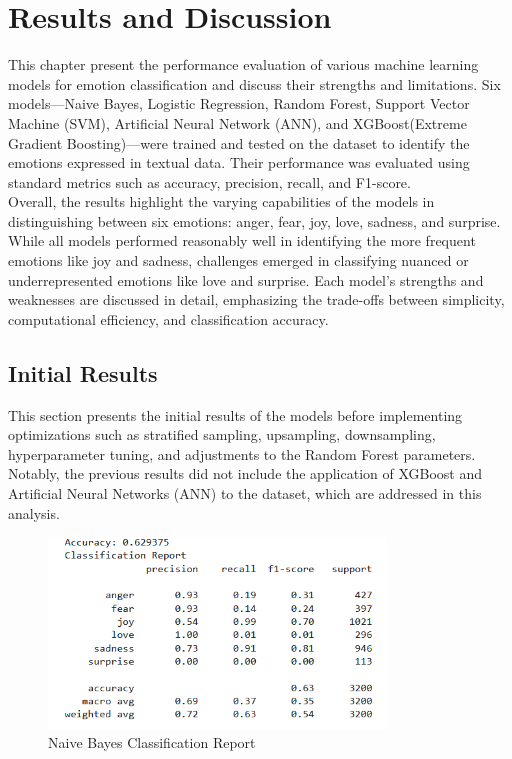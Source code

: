 \section{Results and Discussion}
This chapter present the performance evaluation of various machine learning models for emotion classification and discuss their strengths and limitations. Six models—Naive Bayes, Logistic Regression, Random Forest, Support Vector Machine (SVM), Artificial Neural Network (ANN), and XGBoost(Extreme Gradient Boosting)—were trained and tested on the dataset to identify the emotions expressed in textual data. Their performance was evaluated using standard metrics such as accuracy, precision, recall, and F1-score.\\

Overall, the results highlight the varying capabilities of the models in distinguishing between six emotions: anger, fear, joy, love, sadness, and surprise. While all models performed reasonably well in identifying the more frequent emotions like joy and sadness, challenges emerged in classifying nuanced or underrepresented emotions like love and surprise. Each model's strengths and weaknesses are discussed in detail, emphasizing the trade-offs between simplicity, computational efficiency, and classification accuracy.\\

\subsection{Initial Results}
This section presents the initial results of the models before implementing optimizations such as stratified sampling, upsampling, downsampling, hyperparameter tuning, and adjustments to the Random Forest parameters. Notably, the previous results did not include the application of XGBoost and Artificial Neural Networks (ANN) to the dataset, which are addressed in this analysis.\\

\begin{figure}[h!]
	\centering
	\includegraphics[width=0.8\textwidth]{images/init_result_naive_bayes.png}
	\caption{Naive Bayes Classification Report}
	\label{fig:initial_naive_bayes}
\end{figure}

